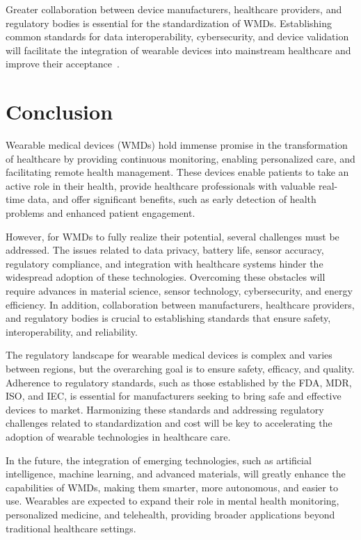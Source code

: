 \documentclass[journal]{IEEEtran}
\begin{document}
        Greater collaboration between device manufacturers, healthcare providers, and regulatory bodies is essential for the standardization of WMDs. Establishing common standards for data interoperability, cybersecurity, and device validation will facilitate the integration of wearable devices into mainstream healthcare and improve their acceptance~\cite{Ravizza2019}.




\section{Conclusion}
\label{10.Conclusion}

Wearable medical devices (WMDs) hold immense promise in the transformation of healthcare by providing continuous monitoring, enabling personalized care, and facilitating remote health management. These devices enable patients to take an active role in their health, provide healthcare professionals with valuable real-time data, and offer significant benefits, such as early detection of health problems and enhanced patient engagement.

However, for WMDs to fully realize their potential, several challenges must be addressed. The issues related to data privacy, battery life, sensor accuracy, regulatory compliance, and integration with healthcare systems hinder the widespread adoption of these technologies. Overcoming these obstacles will require advances in material science, sensor technology, cybersecurity, and energy efficiency. In addition, collaboration between manufacturers, healthcare providers, and regulatory bodies is crucial to establishing standards that ensure safety, interoperability, and reliability.

The regulatory landscape for wearable medical devices is complex and varies between regions, but the overarching goal is to ensure safety, efficacy, and quality. Adherence to regulatory standards, such as those established by the FDA, MDR, ISO, and IEC, is essential for manufacturers seeking to bring safe and effective devices to market. Harmonizing these standards and addressing regulatory challenges related to standardization and cost will be key to accelerating the adoption of wearable technologies in healthcare care.

In the future, the integration of emerging technologies, such as artificial intelligence, machine learning, and advanced materials, will greatly enhance the capabilities of WMDs, making them smarter, more autonomous, and easier to use. Wearables are expected to expand their role in mental health monitoring, personalized medicine, and telehealth, providing broader applications beyond traditional healthcare settings.
\end{document}
